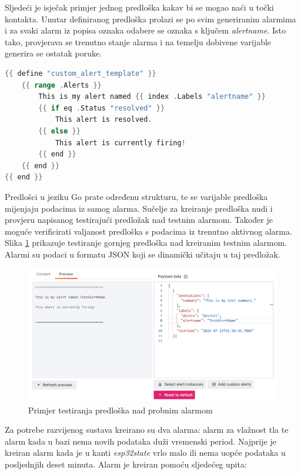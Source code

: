 Sljedeći je isječak primjer jednog predloška kakav bi se mogao naći u točki kontakta. Unutar definiranog predloška prolazi se po svim generiranim alarmima i za svaki alarm iz popisa oznaka odabere se oznaka s ključem \textit{alertname}. Isto tako, provjerava se trenutno stanje alarma i na temelju dobivene varijable generira se ostatak poruke. 

\begin{lstlisting}[caption={Primjer predloška u programskom jeziku Go}, language=go]
{{ define "custom_alert_template" }}
	{{ range .Alerts }}
		This is my alert named {{ index .Labels "alertname" }}
		{{ if eq .Status "resolved" }}
			This alert is resolved.
		{{ else }}
			This alert is currently firing!
		{{ end }}
	{{ end }}
{{ end }}
\end{lstlisting}

Predlošci u jeziku Go prate određenu strukturu, te se varijable predloška mijenjaju podacima iz samog alarma. Sučelje za kreiranje predloška nudi i provjeru napisanog testirajući predložak nad testnim alarmom. Također je moguće verificirati valjanost predloška s podacima iz trenutno aktivnog alarma. Slika \ref{fig:grafana_templating} prikazuje testiranje gornjeg predloška nad kreiranim testnim alarmom. Alarmi su podaci u formatu JSON koji se dinamički učitaju u taj predložak.

\begin{figure}[ht]
	\centering
	\includegraphics[scale=0.35]{imgs/grafana_templating}
	\caption{Primjer testiranja predloška nad probnim alarmom}
	\label{fig:grafana_templating}
\end{figure}

Za potrebe razvijenog sustava kreirano su dva alarma: alarm za vlažnost tla te alarm kada u bazi nema novih podataka duži vremenski period. Najprije je kreiran alarm kada je u kanti \textit{esp32state} vrlo malo ili nema uopće podataka u posljednjih deset minuta. Alarm je kreiran pomoću sljedećeg upita:

